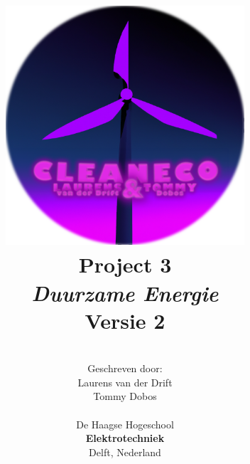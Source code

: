 \title{
\includegraphics[width=3.5in]{IMG/logo/finalcircle.png} \\
\vspace*{1in}
\textbf{Project 3}\\
\textit{Duurzame Energie}\\
Versie 2
}
\author{
\vspace*{1in} \\
  Geschreven door:\\
  Laurens van der Drift\\
  Tommy Dobos\\
		\vspace*{0.2in} \\
		De Haagse Hogeschool\\
        \textbf{Elektrotechniek}\\
        Delft, Nederland
       } 